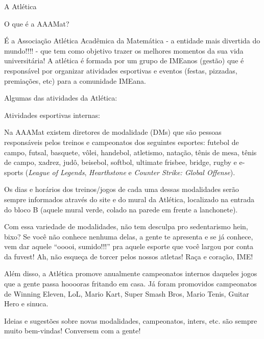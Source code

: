 \begin{secao}{A Atlética} %

\begin{subsecao}{O que é a AAAMat?}

É a Associação Atlética Acadêmica da Matemática - a entidade mais divertida do
mundo!!!! - que tem como objetivo trazer os melhores momentos da sua vida
universitária! A atlética é formada por um grupo de IMEanos (gestão) que é
responsável por organizar atividades esportivas e eventos (festas, pizzadas,
premiações, etc) para a comunidade IMEana.

\end{subsecao}

Algumas das atividades da Atlética:

\begin{subsecao}{Atividades esportivas internas:}

Na AAAMat existem diretores de modalidade (DMs) que são pessoas responsáveis
pelos treinos e campeonatos dos seguintes esportes: futebol de campo, futsal,
basquete, vôlei, handebol, atletismo, natação, tênis de mesa, tênis de campo,
xadrez, judô, beisebol, softbol, ultimate frisbee, bridge, rugby e e-sports
(\textit{League of Legends}, \textit{Hearthstone} e
\textit{Counter Strike: Global Offense}).

Os dias e horários dos treinos/jogos de cada uma dessas modalidades serão
sempre informados através do site e do mural da Atlética, localizado na entrada
do bloco B (aquele mural verde, colado na parede em frente a lanchonete).

Com essa variedade de modalidades, não tem desculpa pro sedentarismo hein,
bixo? Se você não conhece nenhuma delas, a gente te apresenta e se já conhece,
vem dar aquele “ooooi, sumido!!!” pra aquele esporte que você largou por conta
da fuvest! Ah, não esqueça de torcer pelos nossos atletas! Raça e coração, IME!

Além disso, a Atlética promove anualmente campeonatos internos daqueles jogos
que a gente passa hooooras fritando em casa. Já foram promovidos campeonatos de
Winning Eleven, LoL, Mario Kart, Super Smash Bros, Mario Tenis, Guitar Hero e
sinuca.

Ideias e sugestões sobre novas modalidades, campeonatos, inters, etc. são
sempre muito  bem-vindas! Conversem com a gente!

\end{subsecao}


\end{secao}
